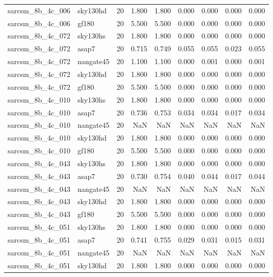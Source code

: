 \begin{tabular}{llrrrrrrr}
sarcsm\_8b\_4c\_006 & sky130hd & 20 & 1.800 & 1.800 & 0.000 & 0.000 & 0.000 & 0.000 \\
sarcsm\_8b\_4c\_006 & gf180 & 20 & 5.500 & 5.500 & 0.000 & 0.000 & 0.000 & 0.000 \\
sarcsm\_8b\_4c\_072 & sky130hs & 20 & 1.800 & 1.800 & 0.000 & 0.000 & 0.000 & 0.000 \\
sarcsm\_8b\_4c\_072 & asap7 & 20 & 0.715 & 0.749 & 0.055 & 0.055 & 0.023 & 0.055 \\
sarcsm\_8b\_4c\_072 & nangate45 & 20 & 1.100 & 1.100 & 0.000 & 0.001 & 0.000 & 0.001 \\
sarcsm\_8b\_4c\_072 & sky130hd & 20 & 1.800 & 1.800 & 0.000 & 0.000 & 0.000 & 0.000 \\
sarcsm\_8b\_4c\_072 & gf180 & 20 & 5.500 & 5.500 & 0.000 & 0.000 & 0.000 & 0.000 \\
sarcsm\_8b\_4c\_010 & sky130hs & 20 & 1.800 & 1.800 & 0.000 & 0.000 & 0.000 & 0.000 \\
sarcsm\_8b\_4c\_010 & asap7 & 20 & 0.736 & 0.753 & 0.034 & 0.034 & 0.017 & 0.034 \\
sarcsm\_8b\_4c\_010 & nangate45 & 20 & NaN & NaN & NaN & NaN & NaN & NaN \\
sarcsm\_8b\_4c\_010 & sky130hd & 20 & 1.800 & 1.800 & 0.000 & 0.000 & 0.000 & 0.000 \\
sarcsm\_8b\_4c\_010 & gf180 & 20 & 5.500 & 5.500 & 0.000 & 0.000 & 0.000 & 0.000 \\
sarcsm\_8b\_4c\_043 & sky130hs & 20 & 1.800 & 1.800 & 0.000 & 0.000 & 0.000 & 0.000 \\
sarcsm\_8b\_4c\_043 & asap7 & 20 & 0.730 & 0.754 & 0.040 & 0.044 & 0.017 & 0.044 \\
sarcsm\_8b\_4c\_043 & nangate45 & 20 & NaN & NaN & NaN & NaN & NaN & NaN \\
sarcsm\_8b\_4c\_043 & sky130hd & 20 & 1.800 & 1.800 & 0.000 & 0.000 & 0.000 & 0.000 \\
sarcsm\_8b\_4c\_043 & gf180 & 20 & 5.500 & 5.500 & 0.000 & 0.000 & 0.000 & 0.000 \\
sarcsm\_8b\_4c\_051 & sky130hs & 20 & 1.800 & 1.800 & 0.000 & 0.000 & 0.000 & 0.000 \\
sarcsm\_8b\_4c\_051 & asap7 & 20 & 0.741 & 0.755 & 0.029 & 0.031 & 0.015 & 0.031 \\
sarcsm\_8b\_4c\_051 & nangate45 & 20 & NaN & NaN & NaN & NaN & NaN & NaN \\
sarcsm\_8b\_4c\_051 & sky130hd & 20 & 1.800 & 1.800 & 0.000 & 0.000 & 0.000 & 0.000 \\

\end{tabular}
